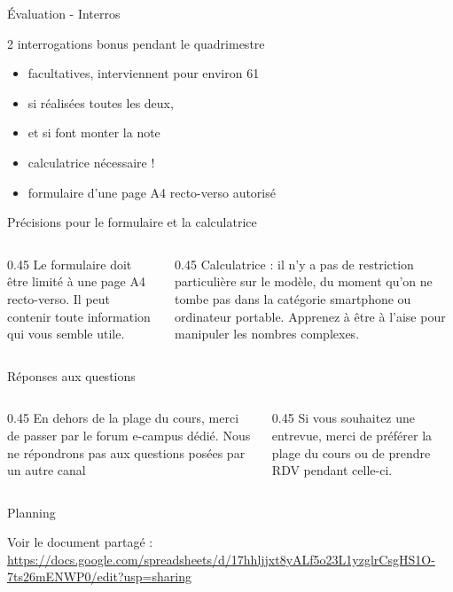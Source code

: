 \begin{frame}{Évaluation - Interros}

2 interrogations bonus pendant le quadrimestre 
\begin{itemize}
  \item facultatives, interviennent pour environ 61 %
  \item si réalisées toutes les deux, 
  \item et si font monter la note
  \item \alert{calculatrice nécessaire !}
  \item formulaire d’une page A4 recto-verso autorisé

\end{itemize}

\end{frame}

\begin{frame}{Précisions pour le formulaire et la calculatrice}

\begin{columns}
  \begin{column}{0.45\textwidth}
    Le \alert{formulaire} doit être limité à une page A4 recto-verso. Il peut contenir toute information qui vous semble utile.
  \end{column}
  \begin{column}{0.45\textwidth}
    \alert{Calculatrice} : il n'y a pas de restriction particulière sur le modèle, du moment qu'on ne tombe pas dans la catégorie smartphone ou ordinateur portable.
    Apprenez à être à l'aise pour manipuler \alert{les nombres complexes}.

  \end{column}
\end{columns}
\end{frame}

\begin{frame}{Réponses aux questions}
\begin{columns}
  \begin{column}{0.45\textwidth}
    En dehors de la plage du cours, merci de passer par le forum \alert{e-campus} dédié. Nous ne répondrons pas aux questions posées par un autre canal

  \end{column}
  \begin{column}{0.45\textwidth}
    Si vous souhaitez une entrevue, merci de préférer la plage du cours ou de prendre RDV pendant celle-ci.
  \end{column}
\end{columns}
\end{frame}


\begin{frame}{Planning}

Voir le document partagé : \\
\url{https://docs.google.com/spreadsheets/d/17hhljjxt8yALf5o23L1yzglrCsgHS1O-7ts26mENWP0/edit?usp=sharing}

\end{frame}
